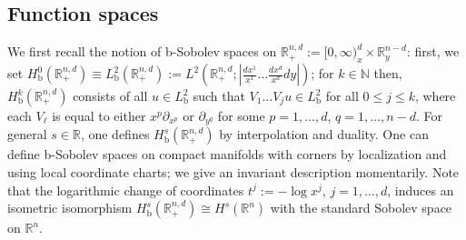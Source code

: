\documentclass[reqno,11pt,letterpaper]{amsart}
\numberwithin{equation}{section}
\numberwithin{figure}{section}
\theoremstyle{definition}
\theoremstyle{remark}
\newcommand{\N}{\mathbb{N}}
\newcommand{\R}{\mathbb{R}}
\newcommand{\pa}{\partial}
\newcommand{\bop}{{\mathrm{b}}}
\newcommand{\Hb}{H_{\bop}}
\begin{document}
\subsection{Function spaces}
\label{SsCptF}

We first recall the notion of b-Sobolev spaces on $\R^{n,d}_+:=[0,\infty)^d_x\times\R^{n-d}_y$: first, we set $\Hb^0(\R^{n,d}_+)\equiv L^2_\bop(\R^{n,d}_+):=L^2(\R^{n,d}_+;|\frac{d x^1}{x^1}\ldots\frac{d x^d}{x^d}d y|)$; for $k\in\N$ then, $\Hb^k(\R^{n,d}_+)$ consists of all $u\in L^2_\bop$ such that $V_1\ldots V_j u\in L^2_\bop$ for all $0\leq j\leq k$, where each $V_\ell$ is equal to either $x^p\pa_{x^p}$ or $\pa_{y^q}$ for some $p=1,\ldots,d$, $q=1,\ldots,n-d$. For general $s\in\R$, one defines $\Hb^s(\R^{n,d}_+)$ by interpolation and duality. One can define b-Sobolev spaces on compact manifolds with corners by localization and using local coordinate charts; we give an invariant description momentarily. Note that the logarithmic change of coordinates $t^j:=-\log x^j$, $j=1,\ldots,d$, induces an isometric isomorphism $\Hb^s(\R^{n,d}_+)\cong H^s(\R^n)$ with the standard Sobolev space on $\R^n$.
\end{document}
